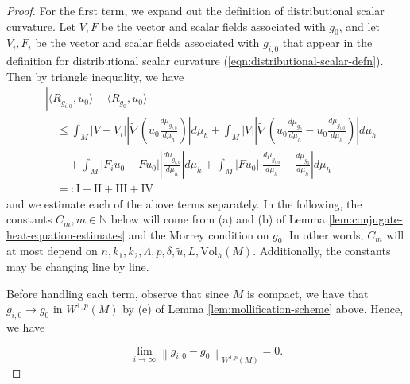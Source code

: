 \documentclass[12pt]{amsart}
\theoremstyle{plain}
\theoremstyle{plain}
\theoremstyle{definition}
\theoremstyle{remark}
\numberwithin{equation}{subsection}
\newcommand{\hdel}{\tilde{\nabla}}
\begin{document}
\begin{proof}
    For the first term, we expand out the definition of distributional scalar curvature. Let $V, F$ be the vector and scalar fields associated with $g_0$, and let $V_i, F_i$ be the vector and scalar fields associated with $g_{i,0}$ that appear in the definition for distributional scalar curvature (\ref{eqn:distributional-scalar-defn}). Then by triangle inequality, we have
    \begin{align*}
        &\left|\langle R_{g_{i,0}},u_0\rangle - \langle R_{g_0}, u_0\rangle\right| \nonumber \\
        &\quad \leq \int_M |V - V_i|\left|\hdel\left(u_0\frac{d\mu_{g_{i,0}}}{d\mu_h}\right)\right|d\mu_h + \int_M |V| \left|\hdel\left(u_0\frac{d\mu_{g_0}}{d\mu_h} - u_0\frac{d\mu_{g_{i,0}}}{d\mu_h}\right)\right|d\mu_h \nonumber \\
        &\qquad + \int_M |F_i u_0 - Fu_0|\left|\frac{d\mu_{g_{i,0}}}{d\mu_h}\right|d\mu_h + \int_M |Fu_0|\left|\frac{d\mu_{g_{i,0}}}{d\mu_h} - \frac{d\mu_{g_0}}{d\mu_h}\right|d\mu_h \nonumber \\
        &\quad =: \text{I} + \text{II} + \text{III} + \text{IV}
    \end{align*}
    and we estimate each of the above terms separately. In the following, the constants $C_m, m \in \mathbb{N}$ below will come from (a) and (b) of Lemma \ref{lem:conjugate-heat-equation-estimates} and the Morrey condition on $g_0$. In other words, $C_m$ will at most depend on $n, k_1, k_2, \Lambda, p, \delta, \tilde{u}, L, \text{Vol}_h(M)$. Additionally, the constants may be changing line by line.

    Before handling each term, observe that since $M$ is compact, we have that $g_{i,0} \to g_0$ in $W^{1,p}(M)$ by (e) of Lemma \ref{lem:mollification-scheme} above. Hence, we have

    \begin{equation*}
        \lim\limits_{i\to\infty}\left\lVert g_{i,0} - g_0\right\rVert_{W^{1,p}(M)} = 0.
    \end{equation*}


\end{proof}
\end{document}
